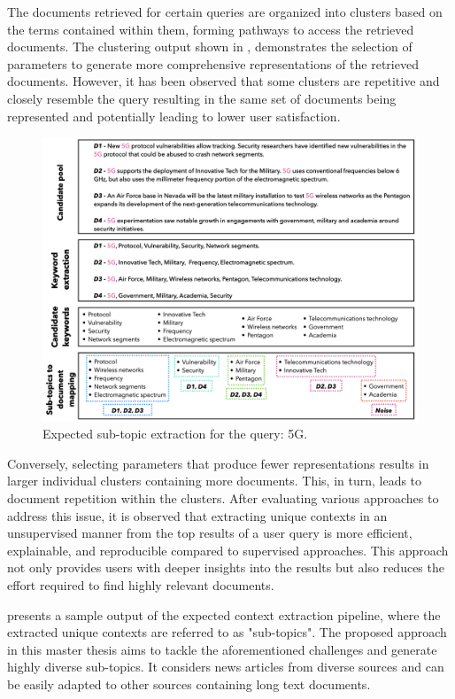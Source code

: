The documents retrieved for certain queries are organized into clusters based on the terms contained within them, forming pathways to access the retrieved documents. The clustering output shown in , demonstrates the selection of parameters to generate more comprehensive representations of the retrieved documents. However, it has been observed that some clusters are repetitive and closely resemble the query resulting in the same set of documents being represented and potentially leading to lower user satisfaction.

\begin{figure}[h]
	\centering
	\includegraphics[width=.99\textwidth]{images/keynotes_images/high_level_approach}
	\caption[Expected sub-topic retrieval.]{Expected sub-topic extraction for the query: 5G. \label{fig:proposal_idea}}
\end{figure}

Conversely, selecting parameters that produce fewer representations results in larger individual clusters containing more documents. This, in turn, leads to document repetition within the clusters. After evaluating various approaches to address this issue, it is observed that extracting unique contexts in an unsupervised manner from the top results of a user query is more efficient, explainable, and reproducible compared to supervised approaches. This approach not only provides users with deeper insights into the results but also reduces the effort required to find highly relevant documents. 

 presents a sample output of the expected context extraction pipeline, where the extracted unique contexts are referred to as "sub-topics". The proposed approach in this master thesis aims to tackle the aforementioned challenges and generate highly diverse sub-topics. It considers news articles from diverse sources and can be easily adapted to other sources containing long text documents.



